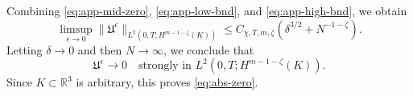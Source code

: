 \documentclass[10pt,reqno]{amsart}
\numberwithin{equation}{section}
\newcommand{\lt}{\left}
\newcommand{\rt}{\right}
\newcommand{\R}{\mathbb R}
\begin{document}
Combining \eqref{eq:app-mid-zero}, \eqref{eq:app-low-bnd}, and \eqref{eq:app-high-bnd}, we obtain
\[
\limsup_{\epsilon\to0} \| \mathfrak U^\epsilon \|_{L^2(0,T;H^{m-1-\zeta}(K))} \le C_{\chi,T,m,\zeta} \lt( \delta^{3/2} + N^{-1-\zeta} \rt).
\]
Letting $\delta \to 0$ and then $N \to \infty$, we conclude that
\[
\mathfrak U^\epsilon \to 0 \quad \text{strongly in } L^2 ( 0,T; H^{m-1-\zeta}(K)).
\]
Since $K \subset \R^3$ is arbitrary, this proves \eqref{eq:abs-zero}.



%
%
%
%
%
%
%
%
%
%

 




  






  
%
%
%
%
%
%
%
%
%
%
\end{document}
